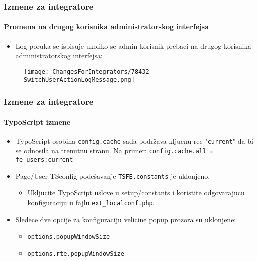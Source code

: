 \begin{frame}[fragile]
	\frametitle{Izmene za integratore}
	\framesubtitle{Promena na drugog korisnika administratorskog interfejsa}

	\begin{itemize}
		\item Log poruka se ispisuje ukoliko se admin korisnik prebaci na drugog korisnika administratorskog interfejsa:
	\end{itemize}

	\begin{figure}
		\texttt{[image: ChangesForIntegrators/78432-SwitchUserActionLogMessage.png]}
	\end{figure}

\end{frame}


\begin{frame}[fragile]
	\frametitle{Izmene za integratore}
	\framesubtitle{TypoScript izmene}

	\begin{itemize}
		\item TypoScript osobina \texttt{config.cache} sada podržava kljucnu rec
			"\texttt{current}" da bi se odnosila na trenutnu stranu. Na primer:\newline
			\smaller\texttt{config.cache.all = fe\_users:current}\normalsize

		\item Page/User TSconfig podešavanje \texttt{TSFE.constants} je uklonjeno.

			\begin{itemize}\smaller
				\item[\ding{228}] Ukljucite TypoScript uslove u setup/constants i koristite odgovarajucu konfiguraciju u fajlu \texttt{ext\_localconf.php}.
			\end{itemize}

		\item Sledece dve opcije za konfiguraciju velicine popup prozora su uklonjene:

			\begin{itemize}
				\item \texttt{options.popupWindowSize}
				\item \texttt{options.rte.popupWindowSize}
			\end{itemize}

	\end{itemize}

\end{frame}

